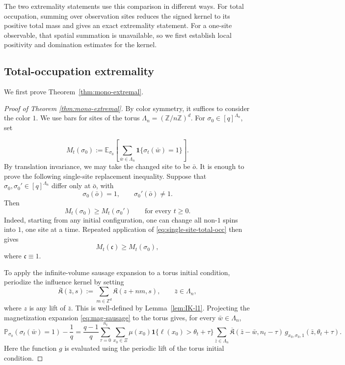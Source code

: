 \documentclass[letterpaper,11pt,reqno]{amsart}
\theoremstyle{definition}
\newcommand{\IK}{\mathfrak{K}}
\begin{document}
The two extremality statements use this comparison in different ways. For total occupation,
summing over observation sites reduces the signed kernel to its positive total mass and gives an
exact extremality statement. For a one-site observable, that spatial summation is unavailable, so
we first establish local positivity and domination estimates for the kernel.




\subsection{Total-occupation extremality}
We first prove Theorem~\ref{thm:mono-extremal}.
\begin{proof}[Proof of Theorem \ref{thm:mono-extremal}]
By color symmetry, it suffices to consider the color \(1\). We use bars for sites of the torus
\(\Lambda_n=(\mathbb Z/n\mathbb Z)^d\). For
\(\sigma_0\in[q]^{\Lambda_n}\), set


\[
M_t(\sigma_0):=
\mathbb E_{\sigma_0}\left[\sum_{\bar w\in\Lambda_n}
\mathbf 1\{\sigma_t(\bar w)=1\}\right].
\]
By translation invariance, we may take the changed site to be \(\bar o\). It is enough to prove the
following single-site replacement inequality. Suppose that
\(\sigma_0,\sigma_0'\in[q]^{\Lambda_n}\) differ only at \(\bar o\), with
\[
\sigma_0(\bar o)=1,\qquad \sigma_0'(\bar o)\neq 1.
\]
Then
\begin{equation}\label{eq:single-site-total-occ}
M_t(\sigma_0)\ge M_t(\sigma_0')
\qquad\text{for every }t\ge0.
\end{equation}
Indeed, starting from any initial configuration, one can change all non-\(1\) spins into \(1\), one
site at a time. Repeated application of \eqref{eq:single-site-total-occ} then gives
\[
M_t(\mathfrak c)\ge M_t(\sigma_0),
\]
where \(\mathfrak c\equiv 1\).


To apply the infinite-volume sausage expansion to a torus initial condition, periodize the
influence kernel by setting
\[
\overline{\IK}(\bar z,s):=\sum_{m\in\mathbb Z^d}\IK(z+nm,s),
\qquad \bar z\in\Lambda_n,
\]
where \(z\) is any lift of \(\bar z\). This is well-defined by Lemma~\ref{lem:IK-l1}.
Projecting the magnetization expansion \eqref{eq:mag-sausage} to the torus gives, for every
\(\bar w\in\Lambda_n\),
\[
\mathbb P_{\sigma_0}(\sigma_t(\bar w)=1)-\frac1q
=
\frac{q-1}{q}
\sum_{\tau=0}^{n_t}\sum_{x_0\in\Xi}
\mu(x_0)\mathbf 1\{\ell(x_0)>\theta_t+\tau\}
\sum_{\bar z\in\Lambda_n}
\overline{\IK}(\bar z-\bar w,n_t-\tau)\,
g_{x_0,\sigma_0,1}(\bar z,\theta_t+\tau).
\]
Here the function \(g\) is evaluated using the periodic lift of the torus initial condition.



\end{proof}
\end{document}
